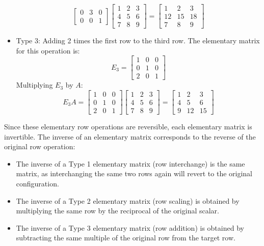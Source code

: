 \begin{eg}
\begin{itemize}[itemsep=1pt,label=$\circ$]
\[\begin{bmatrix}
                0 & 3 & 0 \\
                0 & 0 & 1
            \end{bmatrix} \begin{bmatrix}
                1 & 2 & 3 \\
                4 & 5 & 6 \\
                7 & 8 & 9
            \end{bmatrix} = \begin{bmatrix}
                1 & 2 & 3 \\
                12 & 15 & 18 \\
                7 & 8 & 9
            \end{bmatrix}
        \]
        \item Type 3: Adding 2 times the first row to the third row. The elementary matrix for this operation is:
        \[
            E_3 = \begin{bmatrix}
                1 & 0 & 0 \\
                0 & 1 & 0 \\
                2 & 0 & 1
            \end{bmatrix}
        \]
        Multiplying \( E_3 \) by \( A \):
        \[
            E_3 A = \begin{bmatrix}
                1 & 0 & 0 \\
                0 & 1 & 0 \\
                2 & 0 & 1
            \end{bmatrix} \begin{bmatrix}
                1 & 2 & 3 \\
                4 & 5 & 6 \\
                7 & 8 & 9
            \end{bmatrix} = \begin{bmatrix}
                1 & 2 & 3 \\
                4 & 5 & 6 \\
                9 & 12 & 15
            \end{bmatrix}
        \]
    \end{itemize}
\end{eg}
Since these elementary row operations are reversible, each elementary matrix is invertible. The inverse of an elementary matrix corresponds to the reverse of the original row operation:
\begin{itemize}[itemsep=1pt,label=$\circ$]
    \item The inverse of a Type 1 elementary matrix (row interchange) is the same matrix, as interchanging the same two rows again will revert to the original configuration.
    \item The inverse of a Type 2 elementary matrix (row scaling) is obtained by multiplying the same row by the reciprocal of the original scalar.
    \item The inverse of a Type 3 elementary matrix (row addition) is obtained by subtracting the same multiple of the original row from the target row.
\end{itemize}
